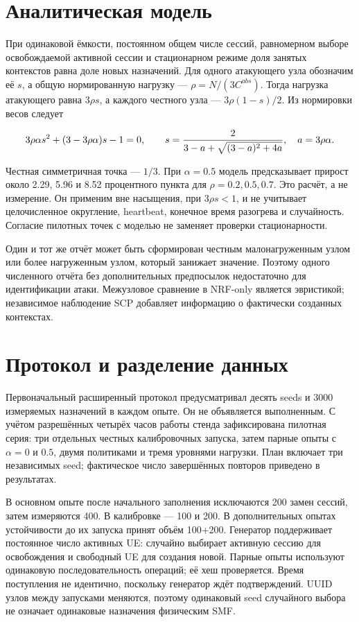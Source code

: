 \documentclass[11pt,a4paper]{article}
\begin{document}
\section*{Аналитическая модель}

При одинаковой ёмкости, постоянном общем числе сессий, равномерном выборе освобождаемой активной сессии и стационарном режиме доля занятых контекстов равна доле новых назначений. Для одного атакующего узла обозначим её \(s\), а общую нормированную нагрузку — \(\rho=N/(3C^{abs})\). Тогда нагрузка атакующего равна \(3\rho s\), а каждого честного узла — \(3\rho(1-s)/2\). Из нормировки весов следует

\[
3\rho\alpha s^2+(3-3\rho\alpha)s-1=0,
\qquad
s={2\over3-a+\sqrt{(3-a)^2+4a}},\quad a=3\rho\alpha.
\]

Честная симметричная точка — \(1/3\). При \(\alpha=0.5\) модель предсказывает прирост около 2.29, 5.96 и 8.52 процентного пункта для \(\rho=0.2,0.5,0.7\). Это расчёт, а не измерение. Он применим вне насыщения, при \(3\rho s<1\), и не учитывает целочисленное округление, heartbeat, конечное время разогрева и случайность. Согласие пилотных точек с моделью не заменяет проверки стационарности.

Один и тот же отчёт может быть сформирован честным малонагруженным узлом или более нагруженным узлом, который занижает значение. Поэтому одного численного отчёта без дополнительных предпосылок недостаточно для идентификации атаки. Межузловое сравнение в NRF-only является эвристикой; независимое наблюдение SCP добавляет информацию о фактически созданных контекстах.

\section*{Протокол и разделение данных}

Первоначальный расширенный протокол предусматривал десять seeds и 3000 измеряемых назначений в каждом опыте. Он не объявляется выполненным. С учётом разрешённых четырёх часов работы стенда зафиксирована пилотная серия: три отдельных честных калибровочных запуска, затем парные опыты с \(\alpha=0\) и \(0.5\), двумя политиками и тремя уровнями нагрузки. План включает три независимых seed; фактическое число завершённых повторов приведено в результатах.

В основном опыте после начального заполнения исключаются 200 замен сессий, затем измеряются 400. В калибровке — 100 и 200. В дополнительных опытах устойчивости до их запуска принят объём 100+200. Генератор поддерживает постоянное число активных UE: случайно выбирает активную сессию для освобождения и свободный UE для создания новой. Парные опыты используют одинаковую последовательность операций; её хеш проверяется. Время поступления не идентично, поскольку генератор ждёт подтверждений. UUID узлов между запусками меняются, поэтому одинаковый seed случайного выбора не означает одинаковые назначения физическим SMF.
\end{document}
